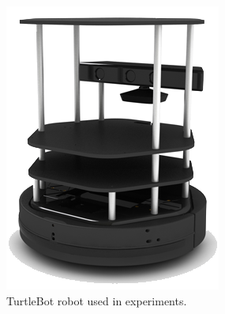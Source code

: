

\begin{figure}
  \centering
  \includegraphics[scale=1.5]{figures/turtlebot.png}
  \caption{TurtleBot robot used in experiments.}
  \label{fig:turtlebot_pic}
\end{figure}
